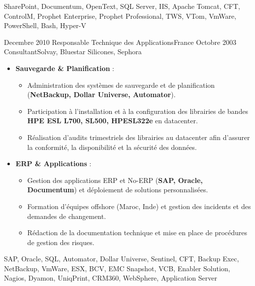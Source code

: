 \begin{experiences}
{\begin{itemize}[left=0pt,label={},itemsep=0.4em]
        \end{itemize}
        \vspace{0.5em}  %
    }
    {SharePoint, Documentum, OpenText, SQL Server, IIS, Apache Tomcat, CFT, ControlM, Prophet Enterprise, Prophet Professional, TWS, VTom, VmWare, PowerShell, Bash, Hyper-V}
\emptySeparator


\consultantexperience
    {Decembre 2010} {Responsable Technique des Applications}{}{France}
    {Octobre 2003}    {Consultant}{Solvay, Bluestar Silicones, Sephora} {
        \begin{itemize}[left=0pt,label={},itemsep=0.5em]
        \vspace{0.3em}  %
          \item \textbf{Sauvegarde \& Planification} :
            \begin{itemize}[itemsep=0.2em,topsep=0.2em,parsep=0pt]
              \small
              \item Administration des systèmes de sauvegarde et de planification (\textbf{NetBackup, Dollar Universe, Automator}).
              \item Participation à l'installation et à la configuration des librairies de bandes \textbf{HPE ESL L700, SL500, HPESL322e} en datacenter.
              \item Réalisation d'audits trimestriels des librairies au datacenter afin d'assurer la conformité, la disponibilité et la sécurité des données.
            \end{itemize}
            \vspace{0.2em}  %
            
          \item \textbf{ERP \& Applications} :
            \begin{itemize}[itemsep=0.2em,topsep=0.2em,parsep=0pt]
              \small
              \item Gestion des applications ERP et No-ERP (\textbf{SAP, Oracle, Documentum}) et déploiement de solutions personnalisées.
              \item Formation d'équipes offshore (Maroc, Inde) et gestion des incidents et des demandes de changement.
              \item Rédaction de la documentation technique et mise en place de procédures de gestion des risques.
            \end{itemize}
        \end{itemize}
        \vspace{0.5em}  %
    }
    {SAP, Oracle, SQL, Automator, Dollar Universe, Sentinel, CFT, Backup Exec, NetBackup, VmWare, ESX, BCV, EMC Snapshot, VCB, Enabler Solution, Nagios, Dyamon, UniqPrint, CRM360, WebSphere, Application Server}

\emptySeparator
\end{experiences}